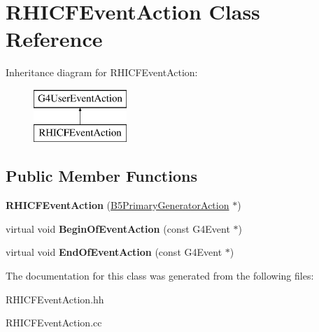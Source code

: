 \hypertarget{class_r_h_i_c_f_event_action}{}\section{R\+H\+I\+C\+F\+Event\+Action Class Reference}
\label{class_r_h_i_c_f_event_action}
Inheritance diagram for R\+H\+I\+C\+F\+Event\+Action\+:\begin{figure}[H]
\begin{center}
\leavevmode
\includegraphics[height=2.000000cm]{class_r_h_i_c_f_event_action}
\end{center}
\end{figure}
\subsection*{Public Member Functions}
\begin{DoxyCompactItemize}
\item 
\hypertarget{class_r_h_i_c_f_event_action_a92b97430fa42224e11e4544fe4904a31}{}{\bfseries R\+H\+I\+C\+F\+Event\+Action} (\hyperlink{class_b5_primary_generator_action}{B5\+Primary\+Generator\+Action} $\ast$)\label{class_r_h_i_c_f_event_action_a92b97430fa42224e11e4544fe4904a31}

\item 
\hypertarget{class_r_h_i_c_f_event_action_a18d53bb5e543926414fa188bafc21100}{}virtual void {\bfseries Begin\+Of\+Event\+Action} (const G4\+Event $\ast$)\label{class_r_h_i_c_f_event_action_a18d53bb5e543926414fa188bafc21100}

\item 
\hypertarget{class_r_h_i_c_f_event_action_aacf0480914ecf3223d6d65891f598a69}{}virtual void {\bfseries End\+Of\+Event\+Action} (const G4\+Event $\ast$)\label{class_r_h_i_c_f_event_action_aacf0480914ecf3223d6d65891f598a69}

\end{DoxyCompactItemize}


The documentation for this class was generated from the following files\+:\begin{DoxyCompactItemize}
\item 
R\+H\+I\+C\+F\+Event\+Action.\+hh\item 
R\+H\+I\+C\+F\+Event\+Action.\+cc\end{DoxyCompactItemize}
